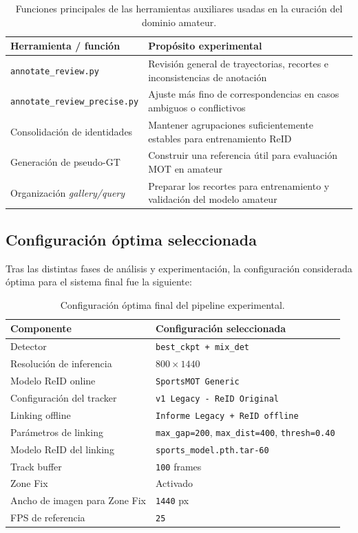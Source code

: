 \documentclass[../MAIN.tex]{subfiles}
\begin{document}
	\begin{table}[H]
		\centering
		\caption{Funciones principales de las herramientas auxiliares usadas en la curación del dominio amateur.}
		\label{tab:cap12_correctores}
		\begin{tabular}{p{4.4cm}p{8.6cm}}
			\toprule
			\textbf{Herramienta / función} & \textbf{Propósito experimental} \\
			\midrule
			\texttt{annotate\_review.py} & Revisión general de trayectorias, recortes e inconsistencias de anotación \\
			\texttt{annotate\_review\_precise.py} & Ajuste más fino de correspondencias en casos ambiguos o conflictivos \\
			Consolidación de identidades & Mantener agrupaciones suficientemente estables para entrenamiento ReID \\
			Generación de pseudo-GT & Construir una referencia útil para evaluación MOT en amateur \\
			Organización \textit{gallery/query} & Preparar los recortes para entrenamiento y validación del modelo amateur \\
			\bottomrule
		\end{tabular}
	\end{table}
	
	\subsection{Configuración óptima seleccionada}
	
	Tras las distintas fases de análisis y experimentación, la configuración considerada óptima para el sistema final fue la siguiente:
	
	\begin{table}[H]
		\centering
		\caption{Configuración óptima final del pipeline experimental.}
		\label{tab:cap12_config_optima}
		\begin{tabular}{p{4.2cm}p{8.3cm}}
			\toprule
			\textbf{Componente} & \textbf{Configuración seleccionada} \\
			\midrule
			Detector & \texttt{best\_ckpt + mix\_det} \\
			Resolución de inferencia & \(800 \times 1440\) \\
			Modelo ReID online & \texttt{SportsMOT Generic} \\
			Configuración del tracker & \texttt{v1 Legacy - ReID Original} \\
			Linking offline & \texttt{Informe Legacy + ReID offline} \\
			Parámetros de linking & \texttt{max\_gap=200}, \texttt{max\_dist=400}, \texttt{thresh=0.40} \\
			Modelo ReID del linking & \texttt{sports\_model.pth.tar-60} \\
			Track buffer & \texttt{100} frames \\
			Zone Fix & Activado \\
			Ancho de imagen para Zone Fix & \texttt{1440} px \\
			FPS de referencia & \texttt{25} \\
			\bottomrule
		\end{tabular}
	\end{table}
	
\end{document}
